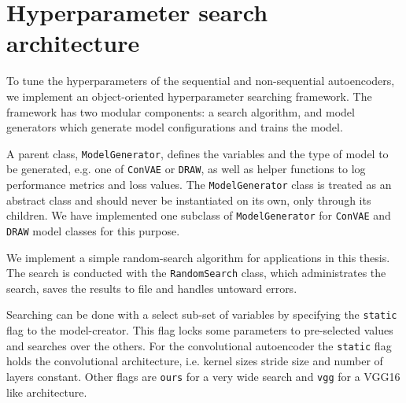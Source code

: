 \section{Hyperparameter search architecture}\label{sec:hyperparam_search_arch}


To tune the hyperparameters of the sequential and non-sequential autoencoders, we implement an object-oriented hyperparameter searching framework. The framework has two modular components: a search algorithm, and model generators which generate model configurations and trains the model. 

A parent class, \lstinline{ModelGenerator}, defines the variables and the type of model to be generated, e.g. one of \lstinline{ConVAE} or \lstinline{DRAW}, as well as helper functions to log performance metrics and loss values. The \lstinline{ModelGenerator} class is treated as an abstract class and should never be instantiated on its own, only through its children. We have implemented one subclass of  \lstinline{ModelGenerator} for  \lstinline{ConVAE} and \lstinline{DRAW} model classes for this purpose. 

We implement a simple random-search algorithm for applications in this thesis. The search is conducted with the \lstinline{RandomSearch} class, which administrates the search, saves the results to file and handles untoward errors. 

Searching can be done with a select sub-set of variables by specifying the \lstinline{static} flag to the model-creator. This flag locks some parameters to pre-selected values and searches over the others. For the convolutional autoencoder the \lstinline{static} flag holds the convolutional architecture, i.e. kernel sizes stride size and number of layers constant. Other flags are \lstinline{ours} for a very wide search and \lstinline{vgg} for a VGG16 like architecture.